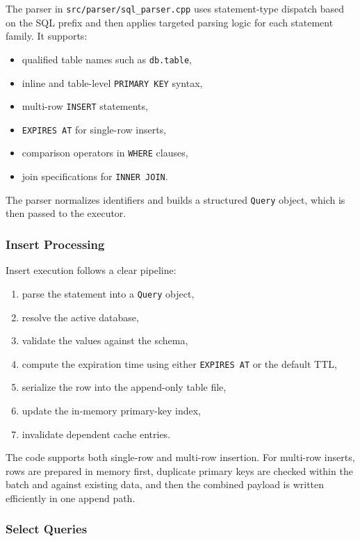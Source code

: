 \documentclass[12pt,a4paper]{article}
\begin{document}
The parser in \texttt{src/parser/sql\_parser.cpp} uses statement-type dispatch
based on the SQL prefix and then applies targeted parsing logic for each
statement family. It supports:

\begin{itemize}[leftmargin=1.8em]
  \item qualified table names such as \texttt{db.table},
  \item inline and table-level \texttt{PRIMARY KEY} syntax,
  \item multi-row \texttt{INSERT} statements,
  \item \texttt{EXPIRES AT} for single-row inserts,
  \item comparison operators in \texttt{WHERE} clauses,
  \item join specifications for \texttt{INNER JOIN}.
\end{itemize}

The parser normalizes identifiers and builds a structured \texttt{Query}
object, which is then passed to the executor.

\subsubsection{Insert Processing}

Insert execution follows a clear pipeline:

\begin{enumerate}[leftmargin=1.8em]
  \item parse the statement into a \texttt{Query} object,
  \item resolve the active database,
  \item validate the values against the schema,
  \item compute the expiration time using either \texttt{EXPIRES AT} or the
        default TTL,
  \item serialize the row into the append-only table file,
  \item update the in-memory primary-key index,
  \item invalidate dependent cache entries.
\end{enumerate}

The code supports both single-row and multi-row insertion. For multi-row
inserts, rows are prepared in memory first, duplicate primary keys are checked
within the batch and against existing data, and then the combined payload is
written efficiently in one append path.

\subsubsection{Select Queries}
\end{document}
